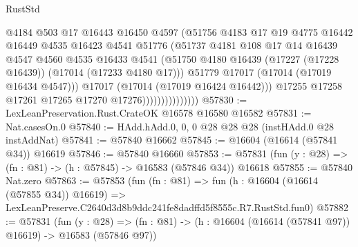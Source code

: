 \begin{lexlean}{RustStd}
\begin{coremodule}
                                  @4184
                                  @503
                                  @17
                                  @16443
                                  @16450
                                  @4597
                                  (@51756
                                    @4183
                                    @17
                                    @19
                                    @4775
                                    @16442
                                    @16449
                                    @4535
                                    @16423
                                    @4541
                                    @51776
                                    (@51737
                                      @4181
                                      @108
                                      @17
                                      @14
                                      @16439
                                      @4547
                                      @4560
                                      @4535
                                      @16433
                                      @4541
                                      (@51750
                                        @4180
                                        @16439
                                        (@17227 (@17228 @16439))
                                        (@17014 (@17233 @4180 @17)))
                                      @51779
                                      @17017
                                      (@17014 (@17019 @16434 @4547)))
                                    @17017
                                    (@17014 (@17019 @16424 @16442)))
                                  @17255
                                  @17258
                                  @17261
                                  @17265
                                  @17270
                                  @17276)))))))))))))))
@57830 := LexLeanPreservation.Rust.CrateOK @16578 @16580 @16582
@57831 := Nat.casesOn.{0}
@57840 := HAdd.hAdd.{0, 0, 0} @28 @28 @28 (instHAdd.{0} @28 instAddNat)
@57841 := @57840 @16662
@57845 := @16604 (@16614 (@57841 @34)) @16619
@57846 := @57840 @16660
@57853 := @57831 (fun (y : @28) => (fn : @81) -> (h : @57845) -> @16583 (@57846 @34)) @16618
@57855 := @57840 Nat.zero
@57863 := @57853
    (fun (fn : @81) =>
    fun (h : @16604 (@16614 (@57855 @34)) @16619) =>
    LexLeanPreserve.C2640d3d8b9ddc241fe8dadffd5f8555c.R7.RustStd.fun0)
@57882 := @57831
    (fun (y : @28) =>
    (fn : @81) -> (h : @16604 (@16614 (@57841 @97)) @16619) -> @16583 (@57846 @97))

\end{coremodule}
\end{lexlean}
